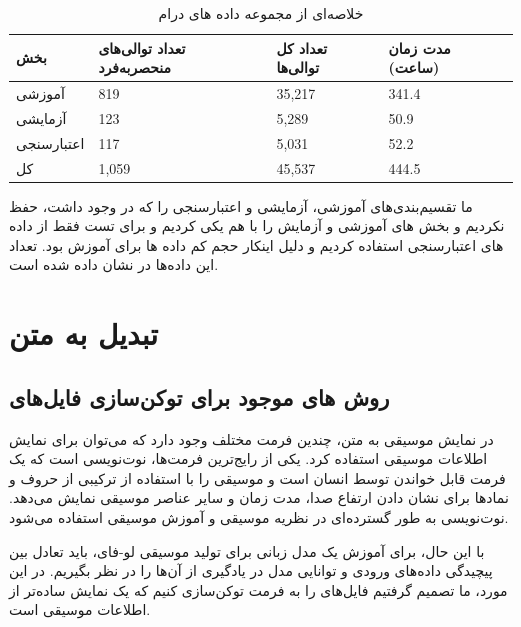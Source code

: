 \begin{table}[!ht]
      \centering
      \caption{خلاصه‌ای از مجموعه داده های درام}
      \label{drumInfo}
      \begin{tabular}{|l|l|l|l|}
            \hline
            بخش        & تعداد توالی‌های منحصربه‌فرد & تعداد کل توالی‌ها & مدت زمان (ساعت) \\ \hline
            آموزشی     & 819                       & 35,217           & 341.4           \\ \hline
            آزمایشی    & 123                       & 5,289            & 50.9            \\ \hline
            اعتبارسنجی & 117                       & 5,031            & 52.2            \\ \hline
            کل         & 1,059                     & 45,537           & 444.5           \\ \hline
      \end{tabular}
\end{table}

ما تقسیم‌بندی‌های آموزشی، آزمایشی و اعتبارسنجی را که در  وجود داشت، حفظ
نکردیم و بخش های آموزشی و آزمایش را با هم یکی کردیم و برای تست فقط از داده های اعتبارسنجی استفاده کردیم و دلیل اینکار حجم کم داده ها برای آموزش بود. تعداد این داده‌ها در  نشان داده شده است.

\section{تبدیل  به متن}\label{se:tokenizer}

\subsection{روش های موجود برای توکن‌سازی فایل‌های }

در نمایش موسیقی به متن، چندین فرمت مختلف وجود دارد که می‌توان برای نمایش اطلاعات
موسیقی استفاده کرد. یکی از رایج‌ترین فرمت‌ها، نوت‌نویسی  است
که یک فرمت قابل خواندن توسط انسان است و موسیقی را با استفاده از ترکیبی
از حروف و نمادها برای نشان دادن ارتفاع صدا، مدت زمان و سایر عناصر موسیقی
نمایش می‌دهد. نوت‌نویسی  به طور گسترده‌ای در نظریه موسیقی و آموزش موسیقی
استفاده می‌شود.

با این حال، برای آموزش یک مدل زبانی برای تولید موسیقی
لو-فای، باید تعادل بین پیچیدگی داده‌های ورودی و توانایی مدل در
یادگیری از آن‌ها را در نظر بگیریم. در این مورد، ما تصمیم گرفتیم فایل‌های
 را به فرمت  توکن‌سازی کنیم که یک نمایش ساده‌تر از
اطلاعات موسیقی است.

